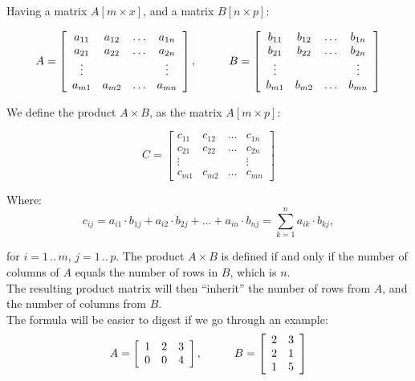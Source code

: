 Having a matrix $A[m\times x]$, and a matrix $B[n\times p]$:

$$
A = \left[ \begin{array}{cccc}
a_{11} & a_{12} & \ldots & a_{1n} \\
a_{21} & a_{22} & \ldots & a_{2n} \\
\vdots &&& \vdots \\
a_{m1} & a_{m2} & \ldots & a_{mn}
\end{array} \right]
,\hspace{10mm}
B = \left[ \begin{array}{cccc}
b_{11} & b_{12} & \ldots & b_{1n} \\
b_{21} & b_{22} & \ldots & b_{2n} \\
\vdots &&& \vdots \\
b_{m1} & b_{m2} & \ldots & b_{mn}
\end{array} \right]
$$

We define the product $A\times B$, as the matrix $A[m\times p]$:

$$
C = \left[ \begin{array}{cccc}
c_{11} & c_{12} & \ldots & c_{1n} \\
c_{21} & c_{22} & \ldots & c_{2n} \\
\vdots &&& \vdots \\
c_{m1} & c_{m2} & \ldots & c_{mn}
\end{array} \right]
$$

Where:
$$
c_{ij} = a_{i1}\cdot b_{1j} + a_{i2}\cdot b_{2j} + \ldots + a_{in}\cdot b_{nj} = \sum_{k=1}^{n} a_{ik}\cdot b_{kj},
$$

for $i=1\,..\,m$, $j=1\,..\,p$. The product $A\times B$ is defined if and only if the number of columns of $A$ equals the number of rows in $B$, which is $n$.
\\

The resulting product matrix will then ``inherit'' the number of rows from $A$, and the number of columns from $B$.
\\

The formula will be easier to digest if we go through an example:
$$
A = \left[ \begin{array}{ccc}
1 & 2 & 3 \\
0 & 0 & 4
\end{array} \right]
, \hspace{10mm}
B = \left[ \begin{array}{cc}
2 & 3 \\
2 & 1 \\
1 & 5
\end{array} \right]
$$

